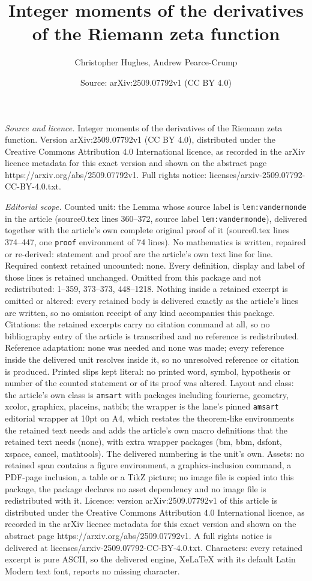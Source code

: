 \documentclass[10pt,a4paper]{amsart}
\title[Integer moments of the derivatives of the Riemann zeta funct]{Integer moments of the derivatives of the Riemann zeta function}
\author{Christopher Hughes, Andrew Pearce-Crump}
\date{Source: arXiv:2509.07792v1 (CC BY 4.0)}
\begin{document}
\maketitle

\noindent\emph{Source and licence.} Integer moments of the derivatives of the Riemann zeta function. Version arXiv:2509.07792v1 (CC BY 4.0), distributed under the Creative Commons Attribution 4.0 International licence, as recorded in the arXiv licence metadata for this exact version and shown on the abstract page https://arxiv.org/abs/2509.07792v1. Full rights notice: licenses/arxiv-2509.07792-CC-BY-4.0.txt.\par\smallskip

\noindent\textit{Editorial scope.} Counted unit: the Lemma whose source label is \texttt{lem:vandermonde} in the article (source0.tex lines 360--372, source label \texttt{lem:vandermonde}), delivered together with the article's own complete original proof of it (source0.tex lines 374--447, one \texttt{proof} environment of 74 lines). No mathematics is written, repaired or re-derived: statement and proof are the article's own text line for line. Required context retained uncounted: none. Every definition, display and label of those lines is retained unchanged. Omitted from this package and not redistributed: 1--359, 373--373, 448--1218. Nothing inside a retained excerpt is omitted or altered: every retained body is delivered exactly as the article's lines are written, so no omission receipt of any kind accompanies this package. Citations: the retained excerpts carry no citation command at all, so no bibliography entry of the article is transcribed and no reference is redistributed. Reference adaptation: none was needed and none was made; every reference inside the delivered unit resolves inside it, so no unresolved reference or citation is produced. Printed slips kept literal: no printed word, symbol, hypothesis or number of the counted statement or of its proof was altered. Layout and class: the article's own class is \texttt{amsart} with packages including fouriernc, geometry, xcolor, graphicx, placeins, natbib; the wrapper is the lane's pinned \texttt{amsart} editorial wrapper at 10pt on A4, which restates the theorem-like environments the retained text needs and adds the article's own macro definitions that the retained text needs (none), with extra wrapper packages (bm, bbm, dsfont, xspace, cancel, mathtools). The delivered numbering is the unit's own. Assets: no retained span contains a figure environment, a graphics-inclusion command, a PDF-page inclusion, a table or a TikZ picture; no image file is copied into this package, the package declares no asset dependency and no image file is redistributed with it. Licence: version arXiv:2509.07792v1 of this article is distributed under the Creative Commons Attribution 4.0 International licence, as recorded in the arXiv licence metadata for this exact version and shown on the abstract page https://arxiv.org/abs/2509.07792v1. A full rights notice is delivered at licenses/arxiv-2509.07792-CC-BY-4.0.txt. Characters: every retained excerpt is pure ASCII, so the delivered engine, XeLaTeX with its default Latin Modern text font, reports no missing character.
\end{document}
